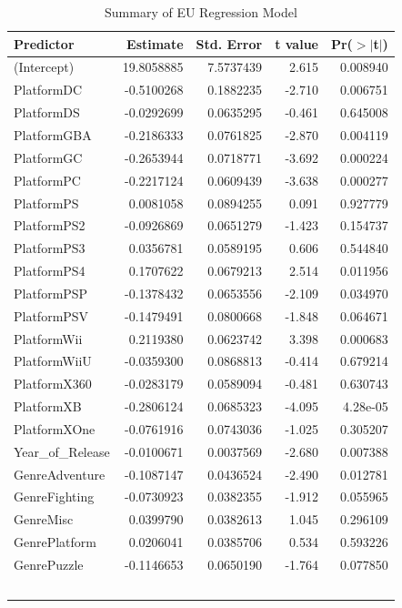 \documentclass[12pt]{article}
\begin{document}
\begin{table}[ht]
  \caption{Summary of EU Regression Model}
  \label{tab:EU}
\centering
\begin{tabular}{lrrrr}
\hline
Predictor & Estimate & Std. Error & t value & Pr($>$$|$t$|$) \\ 
\hline
(Intercept) & 19.8058885 & 7.5737439 & 2.615 & 0.008940 \\
PlatformDC & -0.5100268 & 0.1882235 & -2.710 & 0.006751 \\
PlatformDS & -0.0292699 & 0.0635295 & -0.461 & 0.645008 \\
PlatformGBA & -0.2186333 & 0.0761825 & -2.870 & 0.004119 \\
PlatformGC & -0.2653944 & 0.0718771 & -3.692 & 0.000224 \\
PlatformPC & -0.2217124 & 0.0609439 & -3.638 & 0.000277 \\
PlatformPS & 0.0081058 & 0.0894255 & 0.091 & 0.927779 \\
PlatformPS2 & -0.0926869 & 0.0651279 & -1.423 & 0.154737 \\
PlatformPS3 & 0.0356781 & 0.0589195 & 0.606 & 0.544840 \\
PlatformPS4 & 0.1707622 & 0.0679213 & 2.514 & 0.011956 \\
PlatformPSP & -0.1378432 & 0.0653556 & -2.109 & 0.034970 \\
PlatformPSV & -0.1479491 & 0.0800668 & -1.848 & 0.064671 \\
PlatformWii & 0.2119380 & 0.0623742 & 3.398 & 0.000683 \\
PlatformWiiU & -0.0359300 & 0.0868813 & -0.414 & 0.679214 \\
PlatformX360 & -0.0283179 & 0.0589094 & -0.481 & 0.630743 \\
PlatformXB & -0.2806124 & 0.0685323 & -4.095 & 4.28e-05 \\
PlatformXOne & -0.0761916 & 0.0743036 & -1.025 & 0.305207 \\
Year\_of\_Release & -0.0100671 & 0.0037569 & -2.680 & 0.007388 \\
GenreAdventure & -0.1087147 & 0.0436524 & -2.490 & 0.012781 \\
GenreFighting & -0.0730923 & 0.0382355 & -1.912 & 0.055965 \\
GenreMisc & 0.0399790 & 0.0382613 & 1.045 & 0.296109 \\
GenrePlatform & 0.0206041 & 0.0385706 & 0.534 & 0.593226 \\
GenrePuzzle & -0.1146653 & 0.0650190 & -1.764 & 0.077850 \\
$$
\end{tabular}
\end{table}
\end{document}
